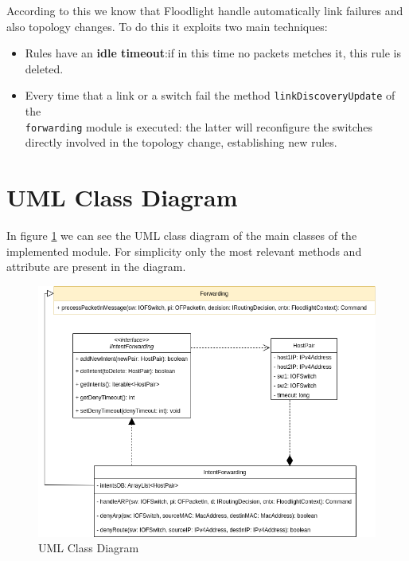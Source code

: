 \documentclass[a4paper]{report}
\begin{document}
	\noindent According to this we know that Floodlight handle automatically link failures and also topology changes. To do this it exploits two main techniques:
	
	\begin{itemize}
        \item Rules have an \textbf{idle timeout}:if in this time no packets metches it, this rule is deleted.
		\item Every time that a link or a switch fail the method \texttt{linkDiscoveryUpdate} of the\\ \texttt{forwarding} module is executed:
			the latter will reconfigure the switches directly involved in the topology change, establishing new rules.
	\end{itemize}
	
	\section{UML Class Diagram}
	\noindent In figure \ref{img:class_diagram} we can see the UML class diagram of the main classes of the implemented module. For simplicity only the most relevant methods and attribute are present in the diagram.
	
	\begin{figure}[htp]
		\centering
		\includegraphics[width=0.7\linewidth]{img/uml.png}
		\caption{UML Class Diagram}
		\label{img:class_diagram}
	\end{figure}
	
	
\end{document}
